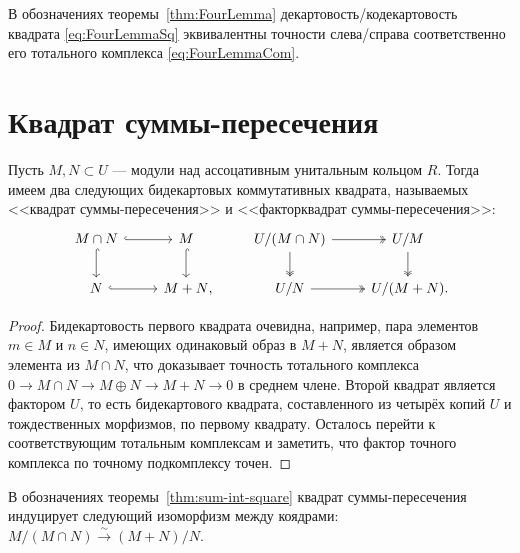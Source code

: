 \documentclass[
	extrafontsizes,
	11pt,
	hyphens,
]{memoir}
\begin{document}
\begin{observation}
В обозначениях теоремы~\ref{thm:FourLemma} де\-кар\-то\-вость/ко\-де\-кар\-то\-вость квадрата \eqref{eq:FourLemmaSq} эквивалентны точности слева/справа соответственно его тотального комплекса \eqref{eq:FourLemmaCom}.
\end{observation}


\section{Квадрат суммы-пересечения}

\begin{theorem}
Пусть \(M, N \subset U\) --- модули над ассоцативным унитальным кольцом \(R\).
Тогда имеем два следующих бидекартовых
коммутативных квадрата, называемых <<квадрат сум\-мы-пе\-ре\-се\-че\-ния>> и <<факторквадрат суммы-пересечения>>:
\begin{equation*}
\begin{tikzcd}
	M \cap N \ar[hookrightarrow]{r} \ar[hookrightarrow]{d} & M \ar[hookrightarrow]{d} & U / (M \cap N) \ar[twoheadrightarrow]{r} \ar[twoheadrightarrow]{d} & U / M \ar[twoheadrightarrow]{d} \\
	N \ar[hookrightarrow]{r} & {M + N\mathrlap{,}} & U / N \ar[twoheadrightarrow]{r} & U / (M + N)\mathrlap{.}
\end{tikzcd}
\end{equation*}
\end{theorem}

\begin{proof}
Бидекартовость первого квадрата очевидна, например, пара элементов \(m \in M\) и \(n \in N\), имеющих одинаковый образ в \(M+N\), является образом элемента из \(M \cap N\), что доказывает точность тотального комплекса \(0 \to M \cap N \to M \oplus N \to M + N \to 0\) в среднем члене. Второй квадрат является фактором \(U\), то есть бидекартового квадрата, составленного из четырёх копий \(U\) и тождественных морфизмов, по первому квадрату. Осталось перейти к соответствующим тотальным комплексам и заметить, что фактор точного комплекса по точному подкомплексу точен.
\end{proof}

\begin{corollary}
В обозначениях теоремы~\ref{thm:sum-int-square} квадрат суммы-пересечения индуцирует следующий изоморфизм между коядрами:
\(M / (M \cap N) \xrightarrow{\sim} (M+N) / N\).
\end{corollary}
\end{document}
